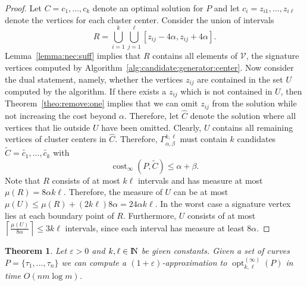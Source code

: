 \documentclass[11pt, letter]{article}
\DeclareMathOperator{\cost}{cost}
\DeclareMathOperator{\opt}{opt}
\newtheorem{theorem}{Theorem}[section]
\newcommand{\thmlab}[1]{{\label{theo:#1}}}
\newcommand{\thmref}[1]{Theorem~\ref{theo:#1}}
\newcommand{\lemref}[1]{Lemma~\ref{lemma:#1}}
\newcommand{\algref}[1]{Algorithm~\ref{alg:#1}}
\providecommand{\eps}{{\varepsilon}}\newcommand{\Astop}{\overline{a}}
\providecommand{\ceil}[1]{\left\lceil {#1} \right\rceil}
\providecommand{\pth}[2][\!]{#1\left({#2}\right)}
\newcommand{\Na}{{\rm I\!\hspace{-0.025em} N}}
\newcommand{\nrClusters}{\ensuremath{k}}
\newcommand{\lenClusters}{\ensuremath{\ell}}
\newcommand{\trajectory}[2]{\ensuremath{{#1}_{#2}}}
\newcommand{\inputSym}{\ensuremath{\tau}}
\newcommand{\inputTraj}[1]{\trajectory{\inputSym}{#1}}
\newcommand{\VtxSet}{\ensuremath{\mathcal{V}}}
\begin{document}
\begin{proof} 
Let  $C=c_1,\dots,c_{\nrClusters}$ denote an optimal solution for $P$ and  
let $c_i=z_{i1},\dots,z_{i{\lenClusters}}$ denote the vertices for each cluster
center. 
Consider the union of intervals
\[ R= \bigcup_{i=1}^{\nrClusters} \bigcup_{j=1}^{\lenClusters} [z_{ij}-4\alpha,z_{ij}+4\alpha].\]
\lemref{nec:suff} implies that $R$ contains all elements of $\VtxSet$, the
signature vertices computed by \algref{candidate:generator:center}.
Now consider the dual statement, namely, whether the vertices $z_{ij}$ are contained in the set $U$ computed by the algorithm.
If there exists a $z_{ij}$ which is not contained in $U$, then
\thmref{remove:one} implies that we can omit $z_{ij}$ from the solution 
while not increasing the cost beyond $\alpha$.
Therefore, let $\widehat{C}$ denote the solution 
where all vertices that lie outside $U$ have been omitted.
Clearly, $U$ contains all remaining vertices of cluster centers in $\widehat{C}$. 
Therefore, $\Gamma^{\nrClusters,\lenClusters}_{\alpha,\beta}$ must contain $k$
candidates $\tilde{C}=\tilde{c_1},\dots,\tilde{c_k}$ with 
\[ \cost_{\infty}(P,\tilde{C}) \leq \alpha + \beta. \]
Note that $R$ consists of at most $\nrClusters\lenClusters$ intervals and has measure at most
$\mu(R)=8\alpha\nrClusters\lenClusters$.
Therefore, the measure of $U$ can be at most 
$\mu(U) \leq \mu(R) +(2\nrClusters\lenClusters)8\alpha = 24\alpha\nrClusters\lenClusters.$
In the worst case a signature vertex lies at each boundary point of $R$.
Furthermore, $U$ consists of at most $\ceil{\frac{\mu(U)}{8\alpha}}\leq 3\nrClusters\lenClusters$ 
intervals, since each interval has measure at least $8\alpha$.
\end{proof}



\begin{theorem}\thmlab{k:l:center:main}
Let $\eps >0$ and $\nrClusters,\lenClusters \in \Na$ be given constants. 
Given a set of curves $P=\{\inputTraj{1},\dots,\inputTraj{n}\}$
we can compute a $(1+\eps)$-approximation to $\opt^{(\infty)}_{\nrClusters,\lenClusters}(P)$
in time $O\pth{nm\log m}$. 
\end{theorem}
\end{document}
